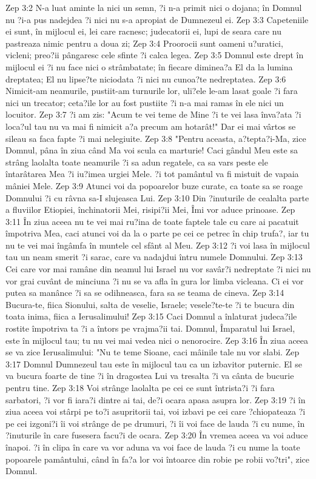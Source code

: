 Zep 3:2  N-a luat aminte la nici un semn, ?i n-a primit nici o dojana; în Domnul nu ?i-a pus nadejdea ?i nici nu s-a apropiat de Dumnezeul ei.
Zep 3:3  Capeteniile ei sunt, în mijlocul ei, lei care racnesc; judecatorii ei, lupi de seara care nu pastreaza nimic pentru a doua zi;
Zep 3:4  Proorocii sunt oameni u?uratici, vicleni; preo?ii pângaresc cele sfinte ?i calca legea.
Zep 3:5  Domnul este drept în mijlocul ei ?i nu face nici o strâmbatate; în fiecare diminea?a El da la lumina dreptatea; El nu lipse?te niciodata ?i nici nu cunoa?te nedreptatea.
Zep 3:6  Nimicit-am neamurile, pustiit-am turnurile lor, uli?ele le-am lasat goale ?i fara nici un trecator; ceta?ile lor au fost pustiite ?i n-a mai ramas în ele nici un locuitor.
Zep 3:7  ?i am zis: "Acum te vei teme de Mine ?i te vei lasa înva?ata ?i loca?ul tau nu va mai fi nimicit a?a precum am hotarât!" Dar ei mai vârtos se sileau sa faca fapte ?i mai nelegiuite.
Zep 3:8  "Pentru aceasta, a?tepta?i-Ma, zice Domnul, pâna în ziua când Ma voi scula ca marturie! Caci gândul Meu este sa strâng laolalta toate neamurile ?i sa adun regatele, ca sa vars peste ele întarâtarea Mea ?i iu?imea urgiei Mele. ?i tot pamântul va fi mistuit de vapaia mâniei Mele.
Zep 3:9  Atunci voi da popoarelor buze curate, ca toate sa se roage Domnului ?i cu râvna sa-I slujeasca Lui.
Zep 3:10  Din ?inuturile de cealalta parte a fluviilor Etiopiei, închinatorii Mei, risipi?ii Mei, Îmi vor aduce prinoase.
Zep 3:11  În ziua aceea nu te vei mai ru?ina de toate faptele tale cu care ai pacatuit împotriva Mea, caci atunci voi da la o parte pe cei ce petrec în chip trufa?, iar tu nu te vei mai îngâmfa în muntele cel sfânt al Meu.
Zep 3:12  ?i voi lasa în mijlocul tau un neam smerit ?i sarac, care va nadajdui întru numele Domnului.
Zep 3:13  Cei care vor mai ramâne din neamul lui Israel nu vor savâr?i nedreptate ?i nici nu vor grai cuvânt de minciuna ?i nu se va afla în gura lor limba vicleana. Ci ei vor putea sa manânce ?i sa se odihneasca, fara sa se teama de cineva.
Zep 3:14  Bucura-te, fiica Sionului, salta de veselie, Israele; vesele?te-te ?i te bucura din toata inima, fiica a Ierusalimului!
Zep 3:15  Caci Domnul a înlaturat judeca?ile rostite împotriva ta ?i a întors pe vrajma?ii tai. Domnul, Împaratul lui Israel, este în mijlocul tau; tu nu vei mai vedea nici o nenorocire.
Zep 3:16  În ziua aceea se va zice Ierusalimului: "Nu te teme Sioane, caci mâinile tale nu vor slabi.
Zep 3:17  Domnul Dumnezeul tau este în mijlocul tau ca un izbavitor puternic. El se va bucura foarte de tine ?i în dragostea Lui va tresalta ?i va cânta de bucurie pentru tine.
Zep 3:18  Voi strânge laolalta pe cei ce sunt întrista?i ?i fara sarbatori, ?i vor fi iara?i dintre ai tai, de?i ocara apasa asupra lor.
Zep 3:19  ?i în ziua aceea voi stârpi pe to?i asupritorii tai, voi izbavi pe cei care ?chiopateaza ?i pe cei izgoni?i îi voi strânge de pe drumuri, ?i îi voi face de lauda ?i cu nume, în ?inuturile în care fusesera facu?i de ocara.
Zep 3:20  În vremea aceea va voi aduce înapoi. ?i în clipa în care va vor aduna va voi face de lauda ?i cu nume la toate popoarele pamântului, când în fa?a lor voi întoarce din robie pe robii vo?tri", zice Domnul.


